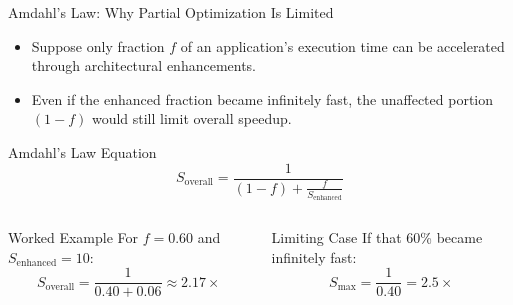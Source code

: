 \documentclass[aspectratio=169,11pt,t]{beamer}
\begin{document}
\begin{frame}{Amdahl's Law: Why Partial Optimization Is Limited}
\vspace{-0.1cm}

\begin{itemize}\setlength{\itemsep}{4pt}
  \item Suppose only fraction $f$ of an application's execution time can be accelerated through architectural enhancements.
  \item Even if the enhanced fraction became infinitely fast, the unaffected portion $(1-f)$ would still limit overall speedup.
\end{itemize}

\vfill

\begin{block}{Amdahl's Law Equation}
\[
S_{\text{overall}}
=
\frac{1}
     {(1-f)+\frac{f}{S_{\text{enhanced}}}}
\]
\end{block}

\vspace{-0.3cm}

\begin{columns}[T,onlytextwidth]


\begin{block}{Worked Example}
For $f=0.60$ and $S_{\text{enhanced}}=10$:
\[
S_{\text{overall}}
=
\frac{1}{0.40+0.06}
\approx
2.17\times
\]
\end{block}


\begin{block}{Limiting Case}
If that 60\% became infinitely fast:
\[
S_{\max}
=
\frac{1}{0.40}
=
2.5\times
\]
\end{block}

\end{columns}

\end{frame}

\end{document}
